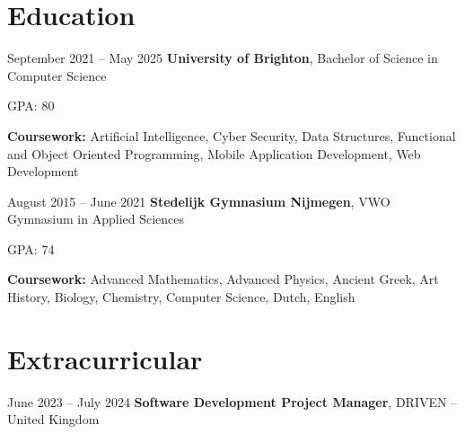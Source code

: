 	\section{Education}
	
	\begin{twocolentry}{
			September 2021 – May 2025
		}
		\textbf{University of Brighton}, Bachelor of Science in Computer Science\end{twocolentry}
	
	\vspace{0.10 cm}
	\begin{onecolentry}
		\begin{highlights}
			\item GPA: 80
			\item \textbf{Coursework:} Artificial Intelligence, Cyber Security, Data Structures, Functional and Object Oriented Programming, Mobile Application Development, Web Development
		\end{highlights}
	\end{onecolentry}
	
	\vspace{0.2 cm}
	
	\begin{twocolentry}{
			August 2015 – June 2021
		}
		\textbf{Stedelijk Gymnasium Nijmegen}, VWO Gymnasium in Applied Sciences\end{twocolentry}
	
	\vspace{0.10 cm}
	\begin{onecolentry}
		\begin{highlights}
			\item GPA: 74
			\item \textbf{Coursework:} Advanced Mathematics, Advanced Physics, Ancient Greek, Art History, Biology, Chemistry, Computer Science, Dutch, English
		\end{highlights}
	\end{onecolentry}
		

%	
%	
%	

%	

	\section{Extracurricular}
	
	\begin{twocolentry}{
			June 2023 – July 2024
		}
		\textbf{Software Development Project Manager}, DRIVEN -- United Kingdom\end{twocolentry}
	
